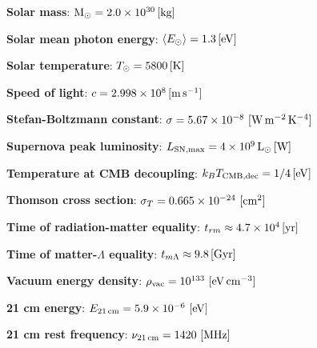 \documentclass[a4paper,11pt]{article}
\begin{document}
{\noindent}\textbf{Solar mass}: ${\rm M}_\odot = 2.0\times10^{30}\,[{\rm kg}]$

{\noindent}\textbf{Solar mean photon energy}: $\langle E_\odot \rangle = 1.3\,[{\rm eV}]$

{\noindent}\textbf{Solar temperature}: $T_\odot = 5800\,[{\rm K}]$

{\noindent}\textbf{Speed of light}: $c=2.998\times10^8\,[{\rm m\,s^{-1}}]$

{\noindent}\textbf{Stefan-Boltzmann constant}: $\sigma=5.67\times10^{-8} ~ [{\rm W\,m^{-2}\,K^{-4}}]$

{\noindent}\textbf{Supernova peak luminosity}: $L_\mathrm{SN,max} = 4\times10^9\,{\rm L_\odot}\,[{\rm W}]$

{\noindent}\textbf{Temperature at CMB decoupling}: $k_BT_\mathrm{CMB,dec} = 1/4\,[{\rm eV}]$

{\noindent}\textbf{Thomson cross section}: $\sigma_T=0.665\times10^{-24} ~ [{\rm cm^2}]$

{\noindent}\textbf{Time of radiation-matter equality}: $t_{rm} \approx 4.7\times10^{4}\,[{\rm yr}]$

{\noindent}\textbf{Time of matter-$\Lambda$ equality}: $t_{m\Lambda}
\approx9.8\,[{\rm Gyr}]$

{\noindent}\textbf{Vacuum energy density}: $\rho_\mathrm{vac} = 10^{133} ~ [{\rm eV\,cm^{-3}}]$

{\noindent}\textbf{21 cm energy}: $E_{21\,\mathrm{cm}} = 5.9\times10^{-6} ~ [{\rm eV}]$

{\noindent}\textbf{21 cm rest frequency}: $\nu_{21\,\mathrm{cm}} = 1420 ~ [{\rm MHz}]$






































\end{document}
